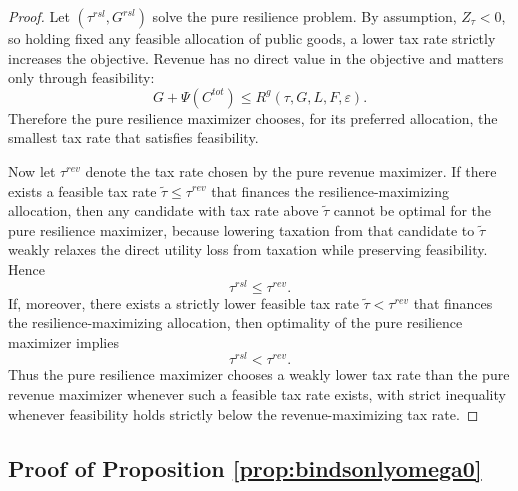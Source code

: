 \documentclass[12pt]{article}
\begin{document}
\begin{proof}
Let $(\tau^{rsl},G^{rsl})$ solve the pure resilience problem. By assumption, $Z_\tau<0$, so holding fixed any feasible allocation of public goods, a lower tax rate strictly increases the objective. Revenue has no direct value in the objective and matters only through feasibility:
\begin{equation}
G+\Psi(C^{tot}) \le R^g(\tau,G,L,F,\varepsilon).
\end{equation}
Therefore the pure resilience maximizer chooses, for its preferred allocation, the smallest tax rate that satisfies feasibility.

Now let $\tau^{rev}$ denote the tax rate chosen by the pure revenue maximizer. If there exists a feasible tax rate $\tilde \tau \le \tau^{rev}$ that finances the resilience-maximizing allocation, then any candidate with tax rate above $\tilde\tau$ cannot be optimal for the pure resilience maximizer, because lowering taxation from that candidate to $\tilde\tau$ weakly relaxes the direct utility loss from taxation while preserving feasibility. Hence
\begin{equation}
\tau^{rsl} \le \tau^{rev}.
\end{equation}
If, moreover, there exists a strictly lower feasible tax rate $\tilde\tau < \tau^{rev}$ that finances the resilience-maximizing allocation, then optimality of the pure resilience maximizer implies
\begin{equation}
\tau^{rsl} < \tau^{rev}.
\end{equation}
Thus the pure resilience maximizer chooses a weakly lower tax rate than the pure revenue maximizer whenever such a feasible tax rate exists, with strict inequality whenever feasibility holds strictly below the revenue-maximizing tax rate.
\end{proof}

\subsection{Proof of Proposition \ref{prop:bindsonlyomega0}}
\end{document}
